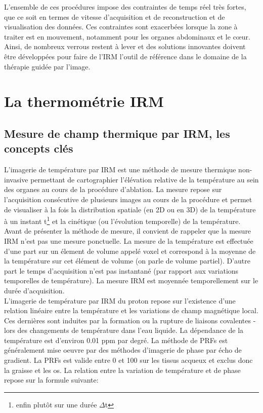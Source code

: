 \documentclass[10pt,a4paper]{report}
\begin{document}
L’ensemble de ces procédures impose des contraintes de temps réel très fortes, que ce soit en termes de vitesse d’acquisition et de reconstruction et de visualisation des données. Ces contraintes sont exacerbées lorsque la zone à traiter est en mouvement, notamment pour les organes abdominaux et le cœur. Ainsi, de nombreux verrous restent à lever et des solutions innovantes doivent être développées pour faire de l’IRM l’outil de référence dans le domaine de la thérapie guidée par l’image.

\section{La thermométrie IRM}
\label{chap1-thermometrie}

\subsection{Mesure de champ thermique par IRM, les concepts clés}

L'imagerie de température par IRM est une méthode de mesure thermique non-invasive permettant de cartographier l'élévation relative de la température au sein des organes au cours de la procédure d'ablation. La mesure repose sur l'acquisition consécutive de plusieurs images au cours de la procédure et permet de visualiser à la fois la distribution spatiale (en 2D ou en 3D) de la température à un instant t\footnote{enfin plutôt sur une durée $\Delta$t} et la cinétique (ou l'évolution temporelle) de la température. Avant de présenter la méthode de mesure, il convient de rappeler que la mesure IRM n'est pas une mesure ponctuelle. La mesure de la température est effectuée d'une part sur un élement de volume appelé voxel et correspond à la moyenne de la température sur cet élément de volume (on parle de volume partiel). D'autre part le temps d'acquisition n'est pas instantané (par rapport aux variations temporelles de température). La mesure IRM est moyennée temporellement sur le durée d'acquisition. \\

L'imagerie de température par IRM du proton  repose sur l'existence d'une relation linéaire entre la température et les variations de champ magnétique local. Ces dernières sont induites par la formation ou la rupture de liaisons covalentes - lors des changements de température dans l'eau liquide. La dépendance de la température est d'environ 0.01 \ac{ppm} par degré. La méthode de \ac{PRFs} est généralement mise oeuvre par des méthodes d'imagerie de phase par écho de gradient. La \ac{PRFs} est valide entre 0 et 100 \textcelsius sur les tissus acqueux et exclus donc la graisse et les os. La relation entre la variation de température et de phase repose sur la formule suivante: 
\end{document}
